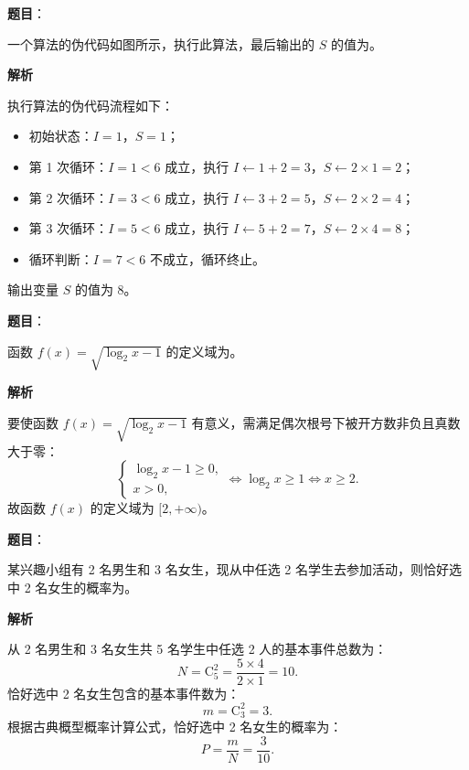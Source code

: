 \begin{answer}

\textbf{题目}：

一个算法的伪代码如图所示，执行此算法，最后输出的 $S$ 的值为\gkblank{}。
\nopagebreak[4]
\begin{center}\end{center}
\nopagebreak[4]
\textbf{解析}

执行算法的伪代码流程如下：
\begin{itemize}
\item 初始状态：$I = 1$，$S = 1$；
\item 第 1 次循环：$I = 1 < 6$ 成立，执行 $I \leftarrow 1 + 2 = 3$，$S \leftarrow 2 \times 1 = 2$；
\item 第 2 次循环：$I = 3 < 6$ 成立，执行 $I \leftarrow 3 + 2 = 5$，$S \leftarrow 2 \times 2 = 4$；
\item 第 3 次循环：$I = 5 < 6$ 成立，执行 $I \leftarrow 5 + 2 = 7$，$S \leftarrow 2 \times 4 = 8$；
\item 循环判断：$I = 7 < 6$ 不成立，循环终止。
\end{itemize}
输出变量 $S$ 的值为 $8$。


\end{answer}
\begin{answer}

\textbf{题目}：

函数 $f(x) = \sqrt{\log_2 x - 1}$ 的定义域为\gkblank{}。

\textbf{解析}

要使函数 $f(x) = \sqrt{\log_2 x - 1}$ 有意义，需满足偶次根号下被开方数非负且真数大于零：
\nopagebreak[4]
\[\begin{cases} \log_2 x - 1 \geqslant 0, \\ x > 0, \end{cases} \iff \log_2 x \geqslant 1 \iff x \geqslant 2.\]
故函数 $f(x)$ 的定义域为 $[2, +\infty)$。

\gkanswer{答案：$[2, +\infty)$}

\end{answer}
\begin{answer}

\textbf{题目}：

某兴趣小组有 2 名男生和 3 名女生，现从中任选 2 名学生去参加活动，则恰好选中 2 名女生的概率为\gkblank{}。

\textbf{解析}

从 2 名男生和 3 名女生共 5 名学生中任选 2 人的基本事件总数为：
\nopagebreak[4]
\[N = \mathrm C_5^2 = \frac{5 \times 4}{2 \times 1} = 10.\]
恰好选中 2 名女生包含的基本事件数为：
\nopagebreak[4]
\[m = \mathrm C_3^2 = 3.\]
根据古典概型概率计算公式，恰好选中 2 名女生的概率为：
\nopagebreak[4]
\[P = \frac{m}{N} = \frac{3}{10}.\]


\end{answer}
